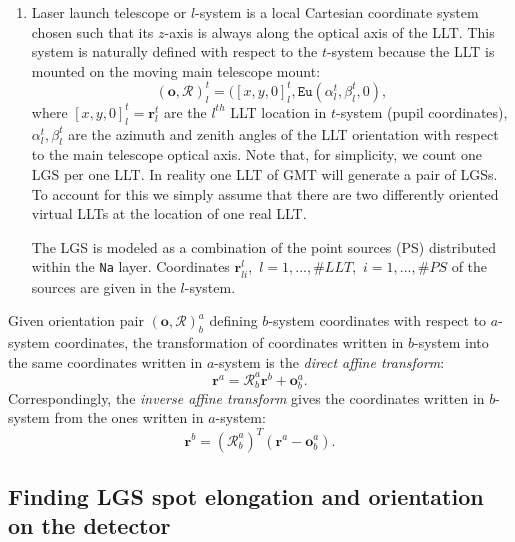 \begin{enumerate}
	\item Laser launch telescope or $l$-system is a local Cartesian coordinate
	system chosen such that its $z$-axis is always along the optical axis of the
	LLT. This system is naturally defined with respect to the $t$-system because
	the LLT is mounted on the moving main telescope mount:
	\begin{equation} \label{eq:l-system}
		(\bm{o},\mathcal{R})_{l}^{t} = ([x,y,0]_{l}^{t},
                                 \texttt{Eu}(\alpha_{l}^{t},\beta_{l}^{t},0),
	\end{equation}
	where $[x,y,0]_{l}^{t} = \bm{r}_{l}^{t}$ are the $l^{th}$ LLT location in
	$t$-system (pupil
	coordinates), $\alpha_{l}^{t},\beta_{l}^{t}$ are the azimuth and zenith
	angles of the LLT orientation with respect to the main telescope optical
	axis. Note that, for simplicity, we count one LGS per one LLT. In reality
	one LLT of GMT will generate a pair of LGSs. To account for this we simply
	assume that there are two differently oriented virtual LLTs at the location
	of one real LLT.

	The LGS is modeled as a combination of the point sources (PS) distributed
	within the \texttt{Na} layer. Coordinates
	$\bm{r}_{li}^{l}, \,\, l =
	1,...,\#LLT, \,\, i=1,...,\#PS$ of the sources are given in the $l$-system.
\end{enumerate}

Given orientation pair $(\bm{o},\mathcal{R})_{b}^{a}$ defining $b$-system
coordinates with respect to $a$-system coordinates, the transformation of
coordinates written in $b$-system into the same coordinates written in
$a$-system is the \emph{direct affine transform}: 
\begin{equation} \label{eq:direct-affine}
	\bm{r}^{a} = \mathcal{R}_{b}^{a} \bm{r}^{b} + \bm{o}_{b}^{a}.
\end{equation}
Correspondingly, the \emph{inverse affine transform} gives the coordinates
written in $b$-system from the ones written in $a$-system:
\begin{equation} \label{eq:inverse-affine}
	\bm{r}^{b} = (\mathcal{R}_{b}^{a})^{T} (\bm{r}^{a} - \bm{o}_{b}^{a}).
\end{equation}


\subsection{Finding LGS spot elongation and orientation on the detector}
\label{sec:elongation-orientation}

